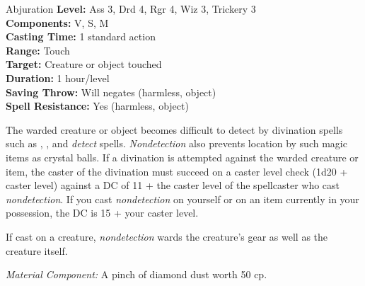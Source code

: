 {Abjuration}
{
	\textbf{Level:}
	Ass 3, Drd 4, Rgr 4, Wiz 3, Trickery 3\\
	\textbf{Components:}
	V, S, M\\
	\textbf{Casting Time:}
	1 standard action\\
	\textbf{Range:}
	Touch\\
	\textbf{Target:}
	Creature or object touched\\
	\textbf{Duration:}
	1 hour/level\\
	\textbf{Saving Throw:}
	Will negates (harmless, object)\\
	\textbf{Spell Resistance:}
	Yes (harmless, object)\\
}
{
	The warded creature or object becomes difficult to detect by divination spells such as , , and \emph{detect} spells. \emph{Nondetection} also prevents location by such magic items as crystal balls. If a divination is attempted against the warded creature or item, the caster of the divination must succeed on a caster level check (1d20 + caster level) against a DC of 11 + the caster level of the spellcaster who cast \emph{nondetection}. If you cast \emph{nondetection} on yourself or on an item currently in your possession, the DC is 15 + your caster level.

	If cast on a creature, \emph{nondetection} wards the creature's gear as well as the creature itself.

	\textit{Material Component:}
	A pinch of diamond dust worth 50 cp.

}
